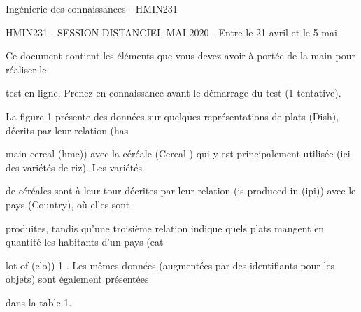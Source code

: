 \documentclass[a4paper,portrait,12pt]{article}
\begin{document}
\begin{flushleft}
Ingénierie des connaissances - HMIN231
\end{flushleft}


\begin{flushleft}
HMIN231 - SESSION DISTANCIEL MAI 2020 - Entre le 21 avril et le 5 mai
\end{flushleft}





\begin{flushleft}
Ce document contient les éléments que vous devez avoir à portée de la main pour réaliser le
\end{flushleft}


\begin{flushleft}
test en ligne. Prenez-en connaissance avant le démarrage du test (1 tentative).
\end{flushleft}





\begin{flushleft}
La figure 1 présente des données sur quelques représentations de plats (Dish), décrits par leur relation (has
\end{flushleft}


\begin{flushleft}
main cereal (hmc)) avec la céréale (Cereal ) qui y est principalement utilisée (ici des variétés de riz). Les variétés
\end{flushleft}


\begin{flushleft}
de céréales sont à leur tour décrites par leur relation (is produced in (ipi)) avec le pays (Country), où elles sont
\end{flushleft}


\begin{flushleft}
produites, tandis qu'une troisième relation indique quels plats mangent en quantité les habitants d'un pays (eat
\end{flushleft}


\begin{flushleft}
lot of (elo)) 1 . Les mêmes données (augmentées par des identifiants pour les objets) sont également présentées
\end{flushleft}


\begin{flushleft}
dans la table 1.
\end{flushleft}
\end{document}
